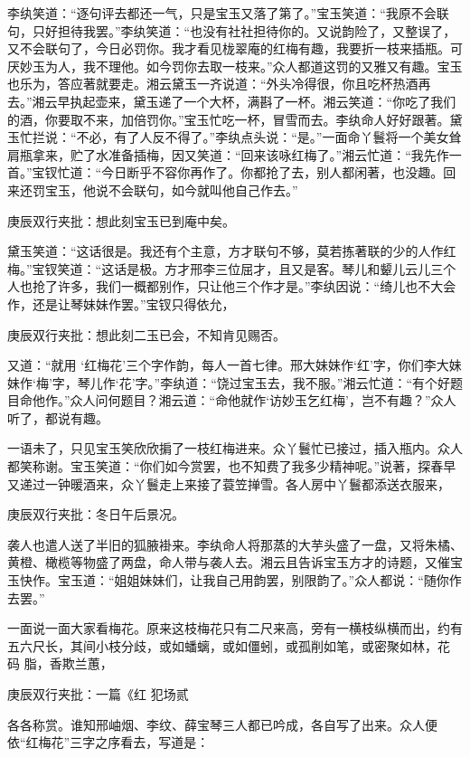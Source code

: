 \begin{parag}
    李纨笑道：“逐句评去都还一气，只是宝玉又落了第了。”宝玉笑道：“我原不会联句，只好担待我罢。”李纨笑道：“也没有社社担待你的。又说韵险了，又整误了，又不会联句了，今日必罚你。我才看见栊翠庵的红梅有趣，我要折一枝来插瓶。可厌妙玉为人，我不理他。如今罚你去取一枝来。”众人都道这罚的又雅又有趣。宝玉也乐为，答应著就要走。湘云黛玉一齐说道：“外头冷得很，你且吃杯热酒再去。”湘云早执起壶来，黛玉递了一个大杯，满斟了一杯。湘云笑道：“你吃了我们的酒，你要取不来，加倍罚你。”宝玉忙吃一杯，冒雪而去。李纨命人好好跟著。黛玉忙拦说：“不必，有了人反不得了。”李纨点头说：“是。”一面命丫鬟将一个美女耸肩瓶拿来，贮了水准备插梅，因又笑道：“回来该咏红梅了。”湘云忙道：“我先作一首。”宝钗忙道：“今日断乎不容你再作了。你都抢了去，别人都闲著，也没趣。回来还罚宝玉，他说不会联句，如今就叫他自己作去。”\begin{note}庚辰双行夹批：想此刻宝玉已到庵中矣。\end{note}黛玉笑道：“这话很是。我还有个主意，方才联句不够，莫若拣著联的少的人作红梅。”宝钗笑道：“这话是极。方才邢李三位屈才，且又是客。琴儿和颦儿云儿三个人也抢了许多，我们一概都别作，只让他三个作才是。”李纨因说：“绮儿也不大会作，还是让琴妹妹作罢。”宝钗只得依允，\begin{note}庚辰双行夹批：想此刻二玉已会，不知肯见赐否。\end{note}又道：“就用 ‘红梅花’三个字作韵，每人一首七律。邢大妹妹作‘红’字，你们李大妹妹作‘梅’字，琴儿作‘花’字。”李纨道：“饶过宝玉去，我不服。”湘云忙道：“有个好题目命他作。”众人问何题目？湘云道：“命他就作‘访妙玉乞红梅’，岂不有趣？”众人听了，都说有趣。
\end{parag}


\begin{parag}
    一语未了，只见宝玉笑欣欣掮了一枝红梅进来。众丫鬟忙已接过，插入瓶内。众人都笑称谢。宝玉笑道：“你们如今赏罢，也不知费了我多少精神呢。”说著，探春早又递过一钟暖酒来，众丫鬟走上来接了蓑笠掸雪。各人房中丫鬟都添送衣服来，\begin{note}庚辰双行夹批：冬日午后景况。\end{note}袭人也遣人送了半旧的狐腋褂来。李纨命人将那蒸的大芋头盛了一盘，又将朱橘、黄橙、橄榄等物盛了两盘，命人带与袭人去。湘云且告诉宝玉方才的诗题，又催宝玉快作。宝玉道：“姐姐妹妹们，让我自己用韵罢，别限韵了。”众人都说：“随你作去罢。”
\end{parag}


\begin{parag}
    一面说一面大家看梅花。原来这枝梅花只有二尺来高，旁有一横枝纵横而出，约有五六尺长，其间小枝分歧，或如蟠螭，或如僵蚓，或孤削如笔，或密聚如林，花 码 脂，香欺兰蕙，\begin{note}庚辰双行夹批：一篇《红 犯场贰\end{note}各各称赏。谁知邢岫烟、李纹、薛宝琴三人都已吟成，各自写了出来。众人便依“红梅花”三字之序看去，写道是：
\end{parag}


